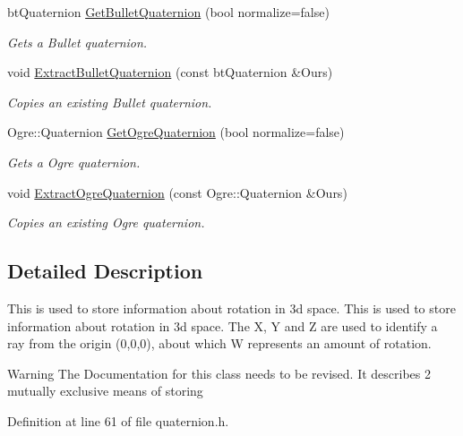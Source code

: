 \begin{DoxyCompactItemize}
btQuaternion \hyperlink{classphys_1_1Quaternion_a30944ae1fe905ee4f5c946c9a0b354f7}{GetBulletQuaternion} (bool normalize=false)
\begin{DoxyCompactList}\small\item\em Gets a Bullet quaternion. \item\end{DoxyCompactList}\item 
void \hyperlink{classphys_1_1Quaternion_a10d3582b2731e70279d7bab43173f317}{ExtractBulletQuaternion} (const btQuaternion \&Ours)
\begin{DoxyCompactList}\small\item\em Copies an existing Bullet quaternion. \item\end{DoxyCompactList}\item 
Ogre::Quaternion \hyperlink{classphys_1_1Quaternion_ad7501687205092c203d2358ca53d3bfe}{GetOgreQuaternion} (bool normalize=false)
\begin{DoxyCompactList}\small\item\em Gets a Ogre quaternion. \item\end{DoxyCompactList}\item 
void \hyperlink{classphys_1_1Quaternion_a942fab675a0b124e1dc5e2febab113e6}{ExtractOgreQuaternion} (const Ogre::Quaternion \&Ours)
\begin{DoxyCompactList}\small\item\em Copies an existing Ogre quaternion. \item\end{DoxyCompactList}\end{DoxyCompactItemize}


\subsection{Detailed Description}
This is used to store information about rotation in 3d space. This is used to store information about rotation in 3d space. The X, Y and Z are used to identify a ray from the origin (0,0,0), about which W represents an amount of rotation. \begin{DoxyWarning}{Warning}
The Documentation for this class needs to be revised. It describes 2 mutually exclusive means of storing 
\end{DoxyWarning}


Definition at line 61 of file quaternion.h.



